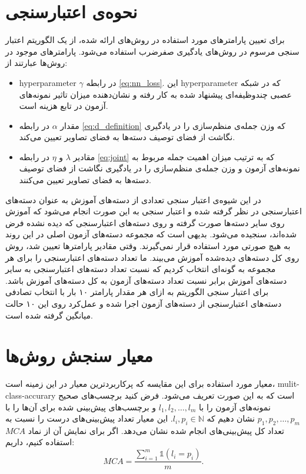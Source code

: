 \section{نحوه‌ی اعتبارسنجی}\label{exp:validation}
برای تعیین پارامترهای مورد استفاده در روش‌های ارائه شده،  از یک الگوریتم اعتبار سنجی مرسوم در روش‌های یادگیری صفرضرب استفاده می‌شود.
پارامترهای موجود در روش‌ها عبارتند از:
\begin{itemize}
\item
 \gls{hyperparameter} $\gamma$ در رابطه \eqref{eq:nn_loss}. این \gls{hyperparameter} که در شبکه عصبی چندوظیفه‌ای پیشنهاد شده به کار رفته و نشان‌دهنده میزان تاثیر نمونه‌های آزمون در تابع هزینه است.
\item
مقدار $\alpha$ در رابطه \eqref{eq:d_definition} که وزن جمله‌ی منظم‌سازی را در یادگیری نگاشت از فضای توصیف دسته‌ها به فضای تصاویر تعیین می‌کند.
\item
مقادیر  $\lambda$ و $\eta$ در رابطه \eqref{eq:joint} که به ترتیب میزان اهمیت جمله مربوط به نمونه‌های آزمون و وزن جمله‌ی منظم‌سازی را در یادگیری نگاشت از فضای توصیف دسته‌ها به فضای تصاویر  تعیین می‌کنند.
\end{itemize}
در این شیوه‌ی اعتبار سنجی تعدادی از دسته‌های آموزش به عنوان دسته‌های اعتبارسنجی در نظر گرفته شده و اعتبار سنجی به این صورت انجام می‌شود که آموزش روی سایر دسته‌ها صورت گرفته و روی دسته‌های اعتبارسنجی که دیده نشده فرض شده‌اند، سنجیده می‌شود. بدیهی است که مجموعه‌ دسته‌های آزمون اصلی در این روند به هیچ صورتی مورد استفاده قرار نمی‌گیرند. وقتی مقادیر پارامترها تعیین شد، روش روی کل دسته‌های دیده‌شده آموزش می‌بیند. ما تعداد دسته‌های اعتبارسنجی را برای هر مجموعه به گونه‌ای انتخاب کردیم که نسبت تعداد دسته‌های اعتبارسنجی به سایر دسته‌های آموزش برابر نسبت تعداد دسته‌های آزمون به کل دسته‌های آموزش باشد. برای اعتبار سنجی الگوریتم به ازای هر مقدار پارامتر ۱۰ بار با انتخاب تصادفی دسته‌های اعتبارسنجی از دسته‌های آزمون اجرا شده و عمل‌کرد روی این ۱۰ حالت میانگین گرفته شده است.
%
\section{معیار سنجش روش‌ها}\label{criteria}
 معیار مورد استفاده برای این مقایسه که پرکاربردترین معیار در این زمینه است، \gls{mulit-class-accurary} است که به این صورت تعریف می‌شود. فرض کنید برچسب‌های صحیح نمونه‌های آزمون را با
$l_1, l_2, \ldots, l_m$
و  برچسب‌های پیش‌بینی شده برای آن‌ها را با
$p_1, p_2, \ldots, p_m$
نشان دهیم که
$l_i, p_i \in \mathbb{N}$.
این معیار تعداد پیش‌بینی‌های درست را نسبت به تعداد کل پیش‌بینی‌های انجام شده نشان می‌دهد. اگر برای نمایش آن از نماد $MCA$ استفاده کنیم، داریم:
\begin{equation}
MCA = \frac{\sum_{i=1}^m \mathds{1}(l_i = p_i)}{m}.
\end{equation}
